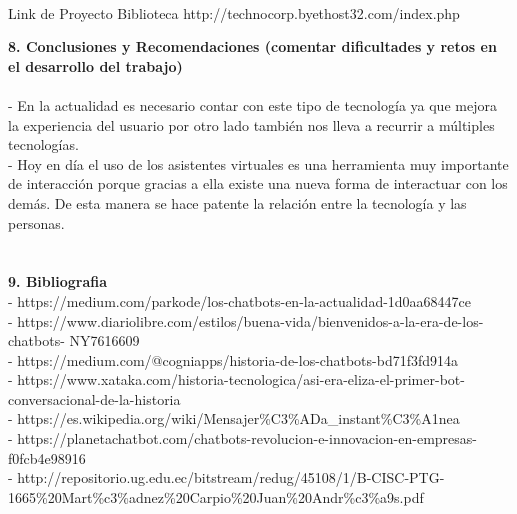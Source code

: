 \begin{flushleft}
\begin{itemize}
\textbf{ }\\
Link de Proyecto Biblioteca
http://technocorp.byethost32.com/index.php

\textbf{8.  Conclusiones y Recomendaciones (comentar dificultades y retos en el desarrollo del trabajo)}\\
\textbf{ }\\
-	En la actualidad es necesario contar con este tipo de tecnología ya que mejora la experiencia del usuario por otro lado también nos lleva a recurrir a múltiples tecnologías.\textbf{ }\\
-	Hoy en día el uso de los asistentes virtuales es una herramienta muy importante de interacción porque gracias a ella existe una nueva forma de interactuar con los demás. De esta manera se hace patente la relación entre la tecnología y las personas.\textbf{ }\\
\textbf{ }\\
\textbf{ }\\
\textbf{9. Bibliografia}\\

- https://medium.com/parkode/los-chatbots-en-la-actualidad-1d0aa68447ce\\
- https://www.diariolibre.com/estilos/buena-vida/bienvenidos-a-la-era-de-los-chatbots- NY7616609\\
- https://medium.com/@cogniapps/historia-de-los-chatbots-bd71f3fd914a\\
- https://www.xataka.com/historia-tecnologica/asi-era-eliza-el-primer-bot- conversacional-de-la-historia\\
- https://es.wikipedia.org/wiki/Mensajer\%C3\%ADa\_instant\%C3\%A1nea\\
- https://planetachatbot.com/chatbots-revolucion-e-innovacion-en-empresas- f0fcb4e98916\\
- http://repositorio.ug.edu.ec/bitstream/redug/45108/1/B-CISC-PTG-1665\%20Mart\%c3\%adnez\%20Carpio\%20Juan\%20Andr\%c3\%a9s.pdf\\


\end{itemize} 


\end{flushleft}